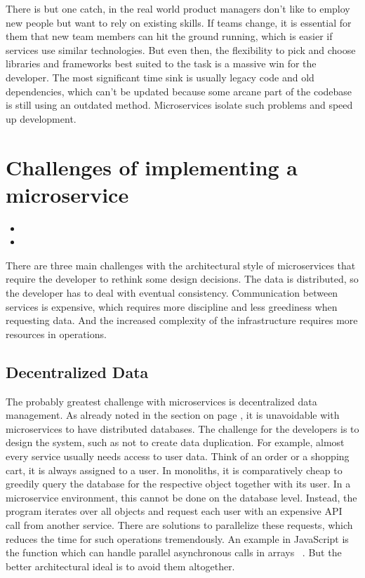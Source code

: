 There is but one catch, in the real world product managers don't like to employ new people but want to rely on existing skills. If teams change, it is essential for them that new team members can hit the ground running, which is easier if services use similar technologies. But even then, the flexibility to pick and choose libraries and frameworks best suited to the task is a massive win for the developer. The most significant time sink is usually legacy code and old dependencies, which can't be updated because some arcane part of the codebase is still using an outdated method. Microservices isolate such problems and speed up development.


\section{Challenges of implementing a microservice}

\begin{itemize}
  \item {}
  \item {}
\end{itemize}

There are three main challenges with the architectural style of microservices that require the developer to rethink some design decisions. The data is distributed, so the developer has to deal with eventual consistency. Communication between services is expensive, which requires more discipline and less greediness when requesting data. And the increased complexity of the infrastructure requires more resources in operations.


\subsection{Decentralized Data}
\label{sec:theory:challenges:data}

The probably greatest challenge with microservices is decentralized data management. As already noted in the section on page \pageref{sec:theory:decentralized-data}, it is unavoidable with microservices to have distributed databases. The challenge for the developers is to design the system, such as not to create data duplication. For example, almost every service usually needs access to user data. Think of an order or a shopping cart, it is always assigned to a user. In monoliths, it is comparatively cheap to greedily query the database for the respective object together with its user. In a microservice environment, this cannot be done on the database level. Instead, the program iterates over all objects and request each user with an expensive API call from another service. There are solutions to parallelize these requests, which reduces the time for such operations tremendously. An example in JavaScript is the  function which can handle parallel asynchronous calls in arrays ~\cite{mdn.2020}. But the better architectural ideal is to avoid them altogether.

